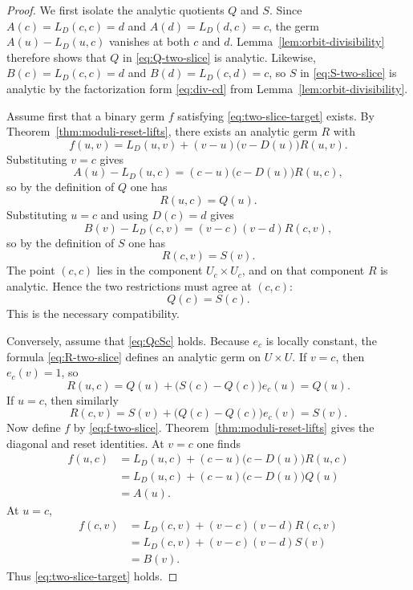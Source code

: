 \documentclass[11pt]{amsart}
\numberwithin{equation}{section}
\theoremstyle{remark}
\theoremstyle{definition}
\begin{document}
\begin{proof}
We first isolate the analytic quotients $Q$ and $S$. Since $A(c)=L_D(c,c)=d$ and $A(d)=L_D(d,c)=c$, the germ $A(u)-L_D(u,c)$ vanishes at both $c$ and $d$. Lemma~\ref{lem:orbit-divisibility} therefore shows that $Q$ in \eqref{eq:Q-two-slice} is analytic. Likewise, $B(c)=L_D(c,c)=d$ and $B(d)=L_D(c,d)=c$, so $S$ in \eqref{eq:S-two-slice} is analytic by the factorization form \eqref{eq:div-cd} from Lemma~\ref{lem:orbit-divisibility}.

Assume first that a binary germ $f$ satisfying \eqref{eq:two-slice-target} exists. By Theorem~\ref{thm:moduli-reset-lifts}, there exists an analytic germ $R$ with
\[
f(u,v)=L_D(u,v)+(v-u)\bigl(v-D(u)\bigr)R(u,v).
\]
Substituting $v=c$ gives
\[
A(u)-L_D(u,c)=(c-u)\bigl(c-D(u)\bigr)R(u,c),
\]
so by the definition of $Q$ one has
\[
R(u,c)=Q(u).
\]
Substituting $u=c$ and using $D(c)=d$ gives
\[
B(v)-L_D(c,v)=(v-c)(v-d)R(c,v),
\]
so by the definition of $S$ one has
\[
R(c,v)=S(v).
\]
The point $(c,c)$ lies in the component $U_c\times U_c$, and on that component $R$ is analytic. Hence the two restrictions must agree at $(c,c)$:
\begin{equation}\label{eq:QcSc}
Q(c)=S(c).
\end{equation}
This is the necessary compatibility.

Conversely, assume that \eqref{eq:QcSc} holds. Because $e_c$ is locally constant, the formula \eqref{eq:R-two-slice} defines an analytic germ on $U\times U$. If $v=c$, then $e_c(v)=1$, so
\[
R(u,c)=Q(u)+\bigl(S(c)-Q(c)\bigr)e_c(u)=Q(u).
\]
If $u=c$, then similarly
\[
R(c,v)=S(v)+\bigl(Q(c)-Q(c)\bigr)e_c(v)=S(v).
\]
Now define $f$ by \eqref{eq:f-two-slice}. Theorem~\ref{thm:moduli-reset-lifts} gives the diagonal and reset identities. At $v=c$ one finds
\begin{align*}
f(u,c)
&=L_D(u,c)+(c-u)\bigl(c-D(u)\bigr)R(u,c) \\
&=L_D(u,c)+(c-u)\bigl(c-D(u)\bigr)Q(u) \\
&=A(u).
\end{align*}
At $u=c$,
\begin{align*}
f(c,v)
&=L_D(c,v)+(v-c)(v-d)R(c,v) \\
&=L_D(c,v)+(v-c)(v-d)S(v) \\
&=B(v).
\end{align*}
Thus \eqref{eq:two-slice-target} holds.


\end{proof}
\end{document}
